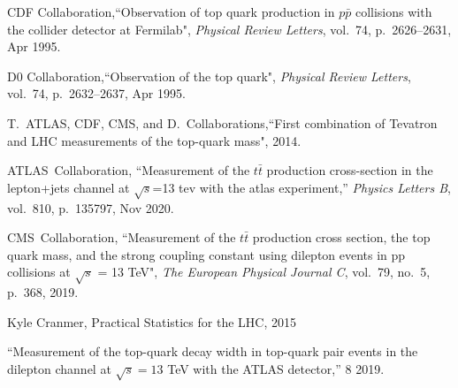\documentclass[12pt]{article}
\begin{document}




\begin{thebibliography}{99}



CDF Collaboration,``Observation of top quark production in $p\bar{p}$ collisions with the collider detector at Fermilab", {\em Physical Review Letters}, vol.~74, p.~2626–2631, Apr 1995.

D0 Collaboration,``Observation of the top quark", {\em Physical Review Letters}, vol.~74, p.~2632–2637, Apr 1995.

T.~ATLAS, CDF, CMS, and D.~Collaborations,``First combination of Tevatron and LHC measurements of the top-quark mass", 2014.

ATLAS~Collaboration, ``Measurement of the $t\bar{t}$ production cross-section in the lepton+jets channel at $\sqrt{s}$=13 tev with the atlas experiment,''
  {\em Physics Letters B}, vol.~810, p.~135797, Nov 2020.

CMS~Collaboration, ``Measurement of the $t\bar{t}$ production cross section, the top quark mass, and the strong coupling constant using dilepton events in pp collisions
  at $\sqrt{s}$ = 13 TeV", {\em The European
  Physical Journal C}, vol.~79, no.~5, p.~368, 2019.

Kyle Cranmer, Practical Statistics for the LHC, 2015

``{Measurement of the top-quark decay width in top-quark pair events in the
  dilepton channel at $\sqrt{s}=13$ TeV with the ATLAS detector},'' 8 2019.


\end{thebibliography}

 
\end{document}
